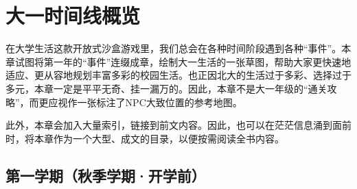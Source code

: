 \chapter{大一时间线概览}

在大学生活这款开放式沙盒游戏里，我们总会在各种时间阶段遇到各种“事件”。本章试图将第一年的“事件”连缀成章，绘制大一生活的一张草图，帮助大家更快速地适应、更从容地规划丰富多彩的校园生活。也正因北大的生活过于多彩、选择过于多元，本章一定是平平无奇、挂一漏万的。因此，本章不是大一年级的“通关攻略”，而更应视作一张标注了NPC大致位置的参考地图。

\vspace{10pt}

此外，本章会加入大量索引，链接到前文内容。因此，也可以在茫茫信息涌到面前时，将本章作为一个大型、成文的目录，以便按需阅读全书内容。

\section{第一学期（秋季学期·开学前）}

\vspace{10pt}


